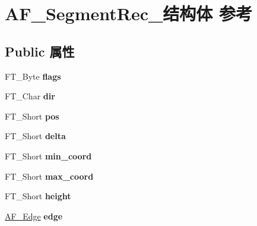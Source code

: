 \hypertarget{struct_a_f___segment_rec__}{}\section{A\+F\+\_\+\+Segment\+Rec\+\_\+结构体 参考}
\label{struct_a_f___segment_rec__}
\subsection*{Public 属性}
\begin{DoxyCompactItemize}
\item 
\mbox{\label{struct_a_f___segment_rec___a06c2fb24257b1ac68ee3e4e705838d67}} 
F\+T\+\_\+\+Byte {\bfseries flags}
\item 
\mbox{\label{struct_a_f___segment_rec___a1f224feb1e9cc92b368f2bdf6cf2d2fb}} 
F\+T\+\_\+\+Char {\bfseries dir}
\item 
\mbox{\label{struct_a_f___segment_rec___ac9fc981f4e37658ec98757f45673f1f0}} 
F\+T\+\_\+\+Short {\bfseries pos}
\item 
\mbox{\label{struct_a_f___segment_rec___a6adf12b3566e2e0b57b53234be26bcd7}} 
F\+T\+\_\+\+Short {\bfseries delta}
\item 
\mbox{\label{struct_a_f___segment_rec___a25de1ec9f40e6bae9aa268a9425db490}} 
F\+T\+\_\+\+Short {\bfseries min\+\_\+coord}
\item 
\mbox{\label{struct_a_f___segment_rec___a2c87699e923b2e510ad6367e94f72e7a}} 
F\+T\+\_\+\+Short {\bfseries max\+\_\+coord}
\item 
\mbox{\label{struct_a_f___segment_rec___a4e07a82754c81f9525bec21d950bbeaa}} 
F\+T\+\_\+\+Short {\bfseries height}
\item 
\mbox{\label{struct_a_f___segment_rec___ae7725abe2fb5d3da8123edc8579124bf}} 
\hyperlink{struct_a_f___edge_rec__}{A\+F\+\_\+\+Edge} {\bfseries edge}
\item 
\mbox{\label{struct_a_f___segment_rec___a68786aed948ad02e736927b29413b77f}} 

\end{DoxyCompactItemize}
